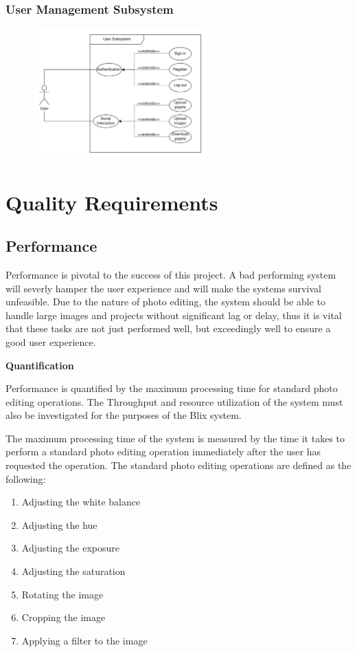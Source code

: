 \documentclass[11pt,a4paper]{article}
\begin{document}
\subsubsection*{User Management Subsystem}
\begin{figure}[htbp]
    \centering
    \includegraphics[width=0.6\textwidth]{../diagramPng/Usecase User-Subsystem.png}
\end{figure}


\pagebreak

\section*{Quality Requirements}

\subsection*{Performance}

Performance is pivotal to the success of this project. A bad performing system
will severly hamper the user experience and will make the systems survival unfeasible.
Due to the nature of photo editing, the system should be able to handle large
images and projects without significant lag or delay, thus it is vital that these tasks are 
not just performed well, but exceedingly well to ensure a good user experience.

{\bf Quantification}

Performance is quantified by the maximum processing time for standard photo editing operations.
The Throughput and resource utilization of the system must also be investigated for the purposes
of the Blix system.

The maximum processing time of the system is measured by the time it takes to perform a standard photo editing operation
immediately after the user has requested the operation. The standard photo editing operations are defined as the following:
\begin{enumerate}
    \item Adjusting the white balance
    \item Adjusting the hue
    \item Adjusting the exposure
    \item Adjusting the saturation
    \item Rotating the image
    \item Cropping the image
    \item Applying a filter to the image
\end{enumerate}
\end{document}
